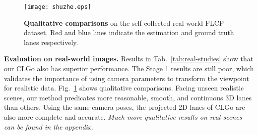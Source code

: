 \documentclass[letterpaper]{article} \usepackage{aaai22}  \usepackage{times}  \usepackage{helvet}  \usepackage{courier}  \usepackage[hyphens]{url}  \usepackage{graphicx} \urlstyle{rm} \def\UrlFont{\rm}  \usepackage{natbib}  \usepackage{caption}
\begin{document}
\begin{figure}[t]
\begin{center}
\texttt{[image: shuzhe.eps]}
\end{center}
\caption{\textbf{Qualitative comparisons} on the self-collected real-world FLCP dataset. Red and blue lines indicate the estimation and ground truth lanes respectively.}
\label{fig:flcp-demo}
\end{figure}
\begin{table}[t]
\begin{center}
\caption{Comparisons on the real-world FLCP dataset~(\%).}
\label{tab:real-studies}
\end{center}
\vspace{-0.5em}
\end{table}
\noindent \textbf{Evaluation on real-world images.}
Results in Tab.~\ref{tab:real-studies} show that our CLGo also has superior performance. The Stage 1 results are still poor, which validates the importance of using camera parameters to transform the viewpoint for realistic data. 
Fig.~\ref{fig:flcp-demo} shows qualitative comparisons. Facing unseen realistic scenes, our method predicates more reasonable, smooth, and continuous 3D lanes than others. Using the same camera poses, the projected 2D lanes of CLGo are also more complete and accurate. \textit{Much more qualitative results on real scenes can be found in the appendix.}
\end{document}
